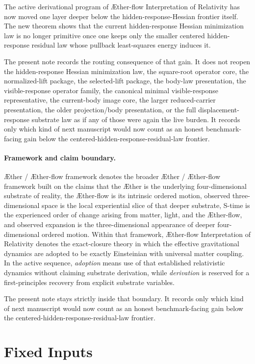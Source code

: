 \documentclass[11pt]{article}
\newcommand{\Aether}{\AE{}ther}
\newcommand{\Aflow}{\AE{}ther-flow}
\newcommand{\TheoryName}{\Aflow{} Interpretation of Relativity}
\newcommand{\TheoryProgram}{\Aether{} / \Aflow{} framework}
\begin{document}
The active derivational program of \TheoryName{} has now moved one layer deeper below the hidden-response-Hessian frontier itself. The new theorem shows that the current hidden-response Hessian minimization law is no longer primitive once one keeps only the smaller centered hidden-response residual law whose pullback least-squares energy induces it.

The present note records the routing consequence of that gain. It does not reopen the hidden-response Hessian minimization law, the square-root operator core, the normalized-lift package, the selected-lift package, the body-law presentation, the visible-response operator family, the canonical minimal visible-response representative, the current-body image core, the larger reduced-carrier presentation, the older projection/body presentation, or the full displacement-response substrate law as if any of those were again the live burden. It records only which kind of next manuscript would now count as an honest benchmark-facing gain below the centered-hidden-response-residual-law frontier.

\paragraph{Framework and claim boundary.}
\TheoryProgram{} denotes the broader \Aether{} / \Aflow{} framework built on the claims that the \Aether{} is the underlying four-dimensional substrate of reality, the \Aflow{} is its intrinsic ordered motion, observed three-dimensional space is the local experiential slice of that deeper substrate, S-time is the experienced order of change arising from matter, light, and the \Aflow{}, and observed expansion is the three-dimensional appearance of deeper four-dimensional ordered motion. Within that framework, \TheoryName{} denotes the exact-closure theory in which the effective gravitational dynamics are adopted to be exactly Einsteinian with universal matter coupling. In the active sequence, \emph{adoption} means use of that established relativistic dynamics without claiming substrate derivation, while \emph{derivation} is reserved for a first-principles recovery from explicit substrate variables.

The present note stays strictly inside that boundary. It records only which kind of next manuscript would now count as an honest benchmark-facing gain below the centered-hidden-response-residual-law frontier.

\section{Fixed Inputs}
\end{document}

